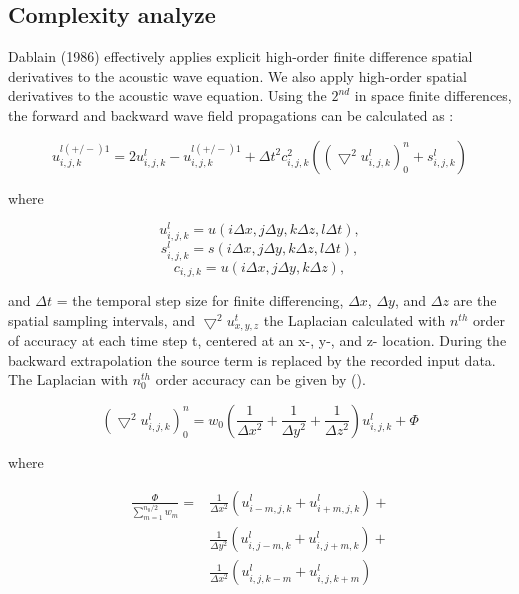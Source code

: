 \subsection{Complexity analyze}

Dablain (1986) effectively applies explicit high-order finite
difference spatial derivatives to the acoustic wave equation.
We also apply high-order spatial derivatives to the acoustic
wave equation. Using the \( 2^{nd} \) in space finite differences, the
forward and backward wave field propagations can be calculated as
\cite{rtm_psdm}:

\begin{equation}
  u ^{l(+/-)1} _{i,j,k} = 2u^l _{i,j,k} - u^{l(+/-)1} _{i,j,k} + \Delta t^2
  c^2 _{i,j,k} (\left( \bigtriangledown ^2 u ^l _{i,j,k}  \right) ^ n_0 +
  s ^l _{i,j,k})
\end{equation}

where

\[u^l _{i,j,k} = u(i\Delta x, j \Delta y, k \Delta z, l \Delta t),\]
\[ s^l _{i,j,k} = s(i\Delta x, j \Delta y, k \Delta z, l \Delta t),\]
\[ c_{i,j,k} = u(i\Delta x, j \Delta y, k \Delta z), \]

and \( \Delta t \) =  the temporal step size for finite differencing, \(
\Delta x \), \( \Delta y \), and \( \Delta z \) are the spatial sampling
intervals, and \( \bigtriangledown ^2 u^t _{x, y, z} \) the Laplacian
calculated with \( n^{th} \) order of accuracy at each time step t,
centered at an x-, y-, and z- location. During the backward extrapolation
the source
term is replaced by the recorded input data. The Laplacian with
\( n^{th} _0 \) order accuracy can be given by ().

\begin{equation}
  (\bigtriangledown ^2 u ^l _{i,j,k})^n_0 = w_0(\frac{1}{\Delta x^2} +
  \frac{1}{\Delta y^2} + \frac{1}{\Delta z^2})u^l _{i, j, k} + \Phi
\end{equation}

where

\begin{equation}
  \begin{split}
    \frac{\Phi}{\sum_{m=1} ^{n_0 / 2}w_m} =
      &\frac{1}{\Delta x^2}\left(u^l _{i-m, j, k}+ u ^l _{i+m, j, k}
      \right) + \\
      &\frac{1}{\Delta y^2}\left(u^l _{i, j-m, k}+ u ^l _{i, j+m, k}
      \right) + \\
      &\frac{1}{\Delta x^2}\left(u^l _{i, j, k-m}+ u ^l _{i, j, k+m} \right)
  \end{split}
\end{equation}


